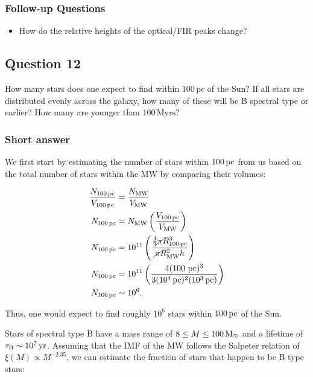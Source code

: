 \documentclass[a4paper,10pt]{article}
\begin{document}
\newpage
\subsubsection{Follow-up Questions}

\begin{itemize}
    \item How do the relative heights of the optical/FIR peaks change?
\end{itemize}


\newpage
\subsection{Question 12}

How many stars does one expect to find within $100\,\mathrm{pc}$ of the Sun? If all stars are distributed evenly across the galaxy, how many of these will be B spectral type or earlier? How many are younger than $100\,\mathrm{Myrs}$?

\subsubsection{Short answer}

We first start by estimating the number of stars within $100\,{\rm pc}$ from us based on the total number of stars within the MW by comparing their volumes:

\begin{align*}
    \frac{N_{\rm 100\,pc}}{V_{\rm 100\,pc}} &= \frac{N_{\rm MW}}{V_{\rm MW}} \\
    N_{\rm 100\,pc} &= N_{\rm MW} \left(\frac{V_{\rm 100\,pc}}{V_{\rm MW}}\right) \\
    N_{\rm 100\,pc} &= 10^{11} \left(\frac{\frac{4}{3}\cancel{\pi} R_{\rm 100\,pc}^3}{\cancel{\pi} R_{\rm MW}^2h}\right) \\
    N_{\rm 100\,pc} &= 10^{11} \left(\frac{4(100\,{\rm \,pc})^3}{3(10^4\,{\rm pc})^2(10^3\,{\rm pc})}\right) \\
    N_{\rm 100\,pc} &\sim 10^6.
\end{align*}

{\noindent}Thus, one would expect to find roughly $10^6$ stars within $100\,{\rm pc}$ of the Sun.

{\noindent}Stars of spectral type B have a mass range of $8\leq M\leq100\,{\rm M_\odot}$ and a lifetime of $\tau_{\rm B}\sim10^7\,{\rm yr}$. Assuming that the IMF of the MW follows the Salpeter relation of $\xi(M)\propto M^{-2.35}$, we can estimate the fraction of stars that happen to be B type stars:
\end{document}
